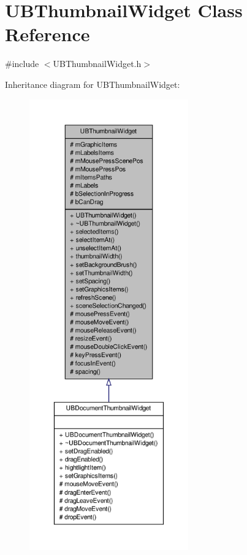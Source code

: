 \hypertarget{class_u_b_thumbnail_widget}{\section{U\-B\-Thumbnail\-Widget Class Reference}
\label{d2/d7e/class_u_b_thumbnail_widget}
}


{\ttfamily \#include $<$U\-B\-Thumbnail\-Widget.\-h$>$}



Inheritance diagram for U\-B\-Thumbnail\-Widget\-:
\nopagebreak
\begin{figure}[H]
\begin{center}
\leavevmode
\includegraphics[height=550pt]{d0/d8d/class_u_b_thumbnail_widget__inherit__graph}
\end{center}
\end{figure}


